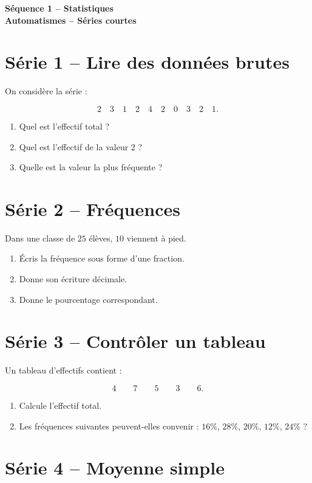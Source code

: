 \documentclass[12pt,a4paper]{article}
\newcommand{\titreseq}[1]{%
\begin{center}
  {\sffamily\LARGE\bfseries\color{TitreC}
  Séquence 1 -- Statistiques}\\[0.2em]
  {\sffamily\large\bfseries\color{SavoirC}#1}
\end{center}
}
\begin{document}
\titreseq{Automatismes -- Séries courtes}


\section*{Série 1 -- Lire des données brutes}

On considère la série :

\[
2\quad3\quad1\quad2\quad4\quad2\quad0\quad3\quad2\quad1.
\]

\begin{enumerate}
  \item Quel est l'effectif total ?
  \item Quel est l'effectif de la valeur \(2\) ?
  \item Quelle est la valeur la plus fréquente ?
\end{enumerate}

\section*{Série 2 -- Fréquences}

Dans une classe de \(25\) élèves, \(10\) viennent à pied.

\begin{enumerate}
  \item Écris la fréquence sous forme d'une fraction.
  \item Donne son écriture décimale.
  \item Donne le pourcentage correspondant.
\end{enumerate}

\section*{Série 3 -- Contrôler un tableau}

Un tableau d'effectifs contient :

\[
4\qquad7\qquad5\qquad3\qquad6.
\]

\begin{enumerate}
  \item Calcule l'effectif total.
  \item Les fréquences suivantes peuvent-elles convenir :
        \(16\%\), \(28\%\), \(20\%\), \(12\%\), \(24\%\) ?
\end{enumerate}

\section*{Série 4 -- Moyenne simple}
\end{document}
